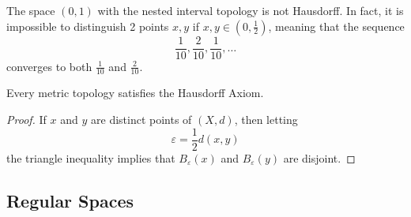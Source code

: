   \begin{example}
    The space $(0,1)$ with the nested interval topology is not Hausdorff. In fact, it is impossible to distinguish 2 points $x, y$ if $x, y \in (0, \frac{1}{2})$, meaning that the sequence
    \begin{equation}
        \frac{1}{10}, \frac{2}{10}, \frac{1}{10}, \ldots
    \end{equation}
    converges to both $\frac{1}{10}$ and $\frac{2}{10}$.
  \end{example} 

  \begin{theorem}
    Every metric topology satisfies the Hausdorff Axiom.
  \end{theorem}
  \begin{proof}
    If $x$ and $y$ are distinct points of $(X, d)$, then letting
    \begin{equation}
      \varepsilon = \frac{1}{2} d(x, y)
    \end{equation}
    the triangle inequality implies that $B_\varepsilon (x)$ and $B_\varepsilon (y)$ are disjoint. 
  \end{proof}

\subsection{Regular Spaces}


